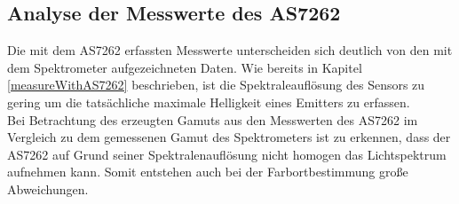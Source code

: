 \documentclass[11pt]{scrartcl}
\begin{document}
\subsection{Analyse der Messwerte des AS7262} \label{measuresWithAS7262}
Die mit dem AS7262 erfassten Messwerte unterscheiden sich deutlich von den mit dem Spektrometer aufgezeichneten Daten. Wie bereits in Kapitel \ref{measureWithAS7262}
beschrieben, ist die Spektraleauflösung des Sensors zu gering um die tatsächliche maximale Helligkeit eines Emitters zu erfassen.\\
Bei Betrachtung des erzeugten Gamuts aus den Messwerten des AS7262 im Vergleich zu dem gemessenen Gamut des Spektrometers ist zu erkennen, dass der AS7262 auf Grund
seiner Spektralenauflösung nicht homogen das Lichtspektrum aufnehmen kann. Somit entstehen auch bei der Farbortbestimmung große Abweichungen.
\end{document}
